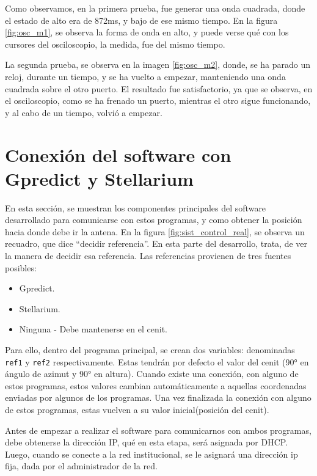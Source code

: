 Como observamos, en la primera prueba, fue generar una onda cuadrada, donde el estado de alto era de 872ms, y bajo de ese mismo tiempo. En la figura \ref{fig:osc_m1}, se observa la forma de onda en alto, y puede verse qué con los cursores del osciloscopio, la medida, fue del mismo tiempo. 


La segunda prueba, se observa en la imagen \ref{fig:osc_m2}, donde, se ha parado un reloj, durante un tiempo, y se ha vuelto a empezar, manteniendo una onda cuadrada sobre el otro puerto. El resultado fue satisfactorio, ya que se observa, en el osciloscopio, como se ha frenado un puerto, mientras el otro sigue funcionando, y al cabo de un tiempo, volvió a empezar.  
 

\section{Conexión del software con Gpredict y Stellarium} 

En esta sección, se muestran los componentes principales del software desarrollado para comunicarse con estos programas, y como obtener la posición hacia donde debe ir la antena. En la figura \ref{fig:sist_control_real}, se observa un recuadro, que dice ``decidir referencia''. En esta parte del desarrollo, trata, de ver la manera de decidir esa referencia. Las referencias provienen de tres fuentes posibles: 
\begin{itemize}
	\item Gpredict.  
	\item Stellarium. 
	\item Ninguna - Debe mantenerse en el cenit.
\end{itemize} 

Para ello, dentro del programa principal, se crean dos variables: denominadas \texttt{ref1} y \texttt{ref2} respectivamente. Estas tendrán por defecto el valor del cenit (90° en ángulo de azimut y 90° en altura). Cuando existe una conexión, con alguno de estos programas, estos valores cambian automáticamente a aquellas coordenadas enviadas por algunos de los programas. Una vez finalizada la conexión con alguno de estos programas, estas vuelven a su valor inicial(posición del cenit). 

Antes de empezar a realizar el software para comunicarnos con ambos programas, debe obtenerse la dirección IP, qué en esta etapa, será asignada por DHCP. Luego, cuando se conecte a la red institucional, se le asignará una dirección ip fija, dada por el administrador de la red. 

